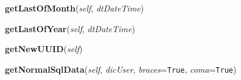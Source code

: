     \vspace{0.5ex}

\hspace{.8\funcindent}\begin{boxedminipage}{\funcwidth}

    \raggedright \textbf{getLastOfMonth}(\textit{self}, \textit{dtDateTime})

\setlength{\parskip}{2ex}
\setlength{\parskip}{1ex}
    \end{boxedminipage}

    \label{cuon:basics:basics:getLastOfYear}

    \vspace{0.5ex}

\hspace{.8\funcindent}\begin{boxedminipage}{\funcwidth}

    \raggedright \textbf{getLastOfYear}(\textit{self}, \textit{dtDateTime})

\setlength{\parskip}{2ex}
\setlength{\parskip}{1ex}
    \end{boxedminipage}

    \label{cuon:basics:basics:getNewUUID}

    \vspace{0.5ex}

\hspace{.8\funcindent}\begin{boxedminipage}{\funcwidth}

    \raggedright \textbf{getNewUUID}(\textit{self})

\setlength{\parskip}{2ex}
\setlength{\parskip}{1ex}
    \end{boxedminipage}

    \label{cuon:basics:basics:getNormalSqlData}

    \vspace{0.5ex}

\hspace{.8\funcindent}\begin{boxedminipage}{\funcwidth}

    \raggedright \textbf{getNormalSqlData}(\textit{self}, \textit{dicUser}, \textit{braces}={\tt True}, \textit{coma}={\tt True})

\setlength{\parskip}{2ex}
\setlength{\parskip}{1ex}
    \end{boxedminipage}

